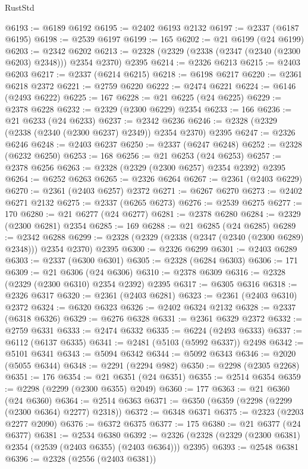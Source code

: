 \begin{lexlean}{RustStd}
\begin{coremodule}
{\begin{coremodule}
{{{{{{{{{{{{{{{{{{{{{{{{{{{{{{{{{{{{{@6193 := @6189 @6192
@6195 := @2402 @6193 @2132
@6197 := @2337 (@6187 @6195)
@6198 := @2539 @6197
@6199 := 165
@6202 := @21 @6199 (@24 @6199)
@6203 := @2342 @6202
@6213 := @2328 (@2329 (@2338 (@2347 (@2340 (@2300 @6203) @2348))) @2354 @2370) @2395
@6214 := @2326 @6213
@6215 := @2403 @6203
@6217 := @2337 (@6214 @6215)
@6218 := @6198 @6217
@6220 := @2361 @6218 @2372
@6221 := @2759 @6220
@6222 := @2474 @6221
@6224 := @6146 (@2493 @6222)
@6225 := 167
@6228 := @21 @6225 (@24 @6225)
@6229 := @2378 @6228
@6232 := @2329 (@2300 @6229) @2354
@6233 := 166
@6236 := @21 @6233 (@24 @6233)
@6237 := @2342 @6236
@6246 := @2328 (@2329 (@2338 (@2340 (@2300 @6237) @2349)) @2354 @2370) @2395
@6247 := @2326 @6246
@6248 := @2403 @6237
@6250 := @2337 (@6247 @6248)
@6252 := @2328 (@6232 @6250)
@6253 := 168
@6256 := @21 @6253 (@24 @6253)
@6257 := @2378 @6256
@6263 := @2328 (@2329 (@2300 @6257) @2354 @2392) @2395
@6264 := @6252 @6263
@6265 := @2326 @6264
@6267 := @2361 (@2403 @6229)
@6270 := @2361 (@2403 @6257) @2372
@6271 := @6267 @6270
@6273 := @2402 @6271 @2132
@6275 := @2337 (@6265 @6273)
@6276 := @2539 @6275
@6277 := 170
@6280 := @21 @6277 (@24 @6277)
@6281 := @2378 @6280
@6284 := @2329 (@2300 @6281) @2354
@6285 := 169
@6288 := @21 @6285 (@24 @6285)
@6289 := @2342 @6288
@6299 := @2328 (@2329 (@2338 (@2347 (@2340 (@2300 @6289) @2348))) @2354 @2370) @2395
@6300 := @2326 @6299
@6301 := @2403 @6289
@6303 := @2337 (@6300 @6301)
@6305 := @2328 (@6284 @6303)
@6306 := 171
@6309 := @21 @6306 (@24 @6306)
@6310 := @2378 @6309
@6316 := @2328 (@2329 (@2300 @6310) @2354 @2392) @2395
@6317 := @6305 @6316
@6318 := @2326 @6317
@6320 := @2361 (@2403 @6281)
@6323 := @2361 (@2403 @6310) @2372
@6324 := @6320 @6323
@6326 := @2402 @6324 @2132
@6328 := @2337 (@6318 @6326)
@6329 := @6276 @6328
@6331 := @2361 @6329 @2372
@6332 := @2759 @6331
@6333 := @2474 @6332
@6335 := @6224 (@2493 @6333)
@6337 := @6112 (@6137 @6335)
@6341 := @2481 (@5103 (@5992 @6337)) @2498
@6342 := @5101 @6341
@6343 := @5094 @6342
@6344 := @5092 @6343
@6346 := @2020 (@5055 @6344)
@6348 := @2291 (@2294 @982)
@6350 := @2298 (@2305 @2268)
@6351 := 176
@6354 := @21 @6351 (@24 @6351)
@6355 := @2514 @6354
@6359 := @2298 (@2299 (@2300 @6355) @2049)
@6360 := 177
@6363 := @21 @6360 (@24 @6360)
@6364 := @2514 @6363
@6371 := @6350 (@6359 (@2298 (@2299 (@2300 @6364) @2277) @2318))
@6372 := @6348 @6371
@6375 := @2323 (@2203 @2277 @2090)
@6376 := @6372 @6375
@6377 := 175
@6380 := @21 @6377 (@24 @6377)
@6381 := @2534 @6380
@6392 := @2326 (@2328 (@2329 (@2300 @6381) @2354 (@2539 (@2403 @6355) (@2403 @6364))) @2395)
@6393 := @2548 @6381
@6396 := @2328 (@2556 (@2403 @6381))
}}}}}}}}}}}}}}}}}}}}}}}}}}}}}}}}}}}}}
\end{coremodule}}
\end{coremodule}
\end{lexlean}

